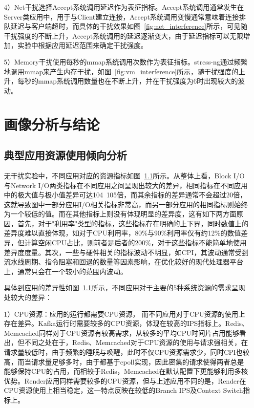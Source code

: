 4）Net干扰选择Accept系统调用延迟作为表征指标。Accept系统调用通常发生在Server类应用中，用于与Client建立连接，Accept系统调用变慢通常意味着连接排队延迟与客户端超时，而具体的干扰效果如图~\ref{fig:net_interference}所示，可见随干扰强度的不断上升，Accept系统调用的延迟逐渐变大，由于延迟指标可以无限增加，实验中根据应用延迟范围来确定干扰强度。

5）Memory干扰使用每秒的mmap系统调用次数作为表征指标。stress-ng通过频繁地调用mmap来产生内存干扰，如图~\ref{fig:vm_interference}所示，随干扰强度的上升，每秒的mmap系统调用数量也在不断上升，并在干扰强度为6时出现较大的波动。

\section{画像分析与结论}

\subsection{典型应用资源使用倾向分析}

无干扰实验中，不同应用对应的资源指标如图~\ref{}所示。从整体上看，Block I/O与Network I/O两类指标在不同应用之间呈现出较大的差异，相同指标在不同应用中的极大值与极小值差异可达104~105倍，而其余指标的差异通常不会超过20倍，这就导致图中一部分应用I/O相关指标非常高，而另一部分应用的相同指标则始终为一个较低的值。而在其他指标上则没有体现明显的差异度，这有如下两方面原因，首先，对于"利用率"类型的指标，这些指标存在明确的上下界，同时数值上的差异度难以直接体现，如对于CPU利用率，80\%与90\%利用率仅有约12\%的数值差异，但计算空闲CPU占比，则前者是后者的200\%，对于这些指标不能简单地使用差异度度量。其次，一些与硬件相关的指标波动不明显，如CPI，其波动通常受到流水线周期、指令阻塞和回退的数量等因素影响，在优化较好的现代处理器平台上，通常只会在一个较小的范围内波动。

具体到应用的差异性如图~\ref{}所示，不同应用对于主要的5种系统资源的需求呈现处较大的差异：

1）CPU资源：应用的运行都需要CPU资源， 而不同应用对于CPU资源的使用上存在差异。Kafka运行时需要较多的CPU资源，体现在较高的IPS指标上。Redis、Memcached同样对于CPU资源有较高需求，从较多的平均CPU时间片占用能够看出，但不同之处在于，Redis、Memcached对于CPU资源的使用与请求强相关，在请求量较低时，由于频繁的睡眠与唤醒，此时不仅CPU资源需求少，同时CPI也较高，而当请求量足够多时，由于都基于epoll实现，因此密集的请求使得两者总是能够保持CPU的占用，而相较于Redis，Memcached在默认配置下更能够利用多核优势。Render应用同样需要较多的CPU资源，但与上述应用不同的是，Render在CPU资源使用上相当稳定，这一特点反映在较低的Branch IPS及Context Switch指标上。


